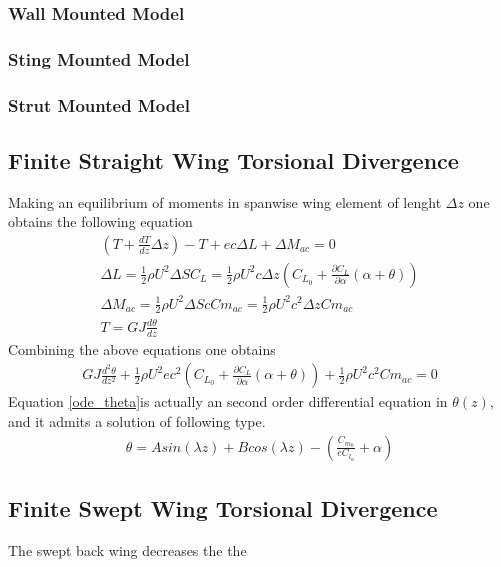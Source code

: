 \subsubsection{Wall Mounted Model}

\subsubsection{Sting Mounted Model}

\subsubsection{Strut Mounted Model}

\subsection{Finite Straight Wing Torsional Divergence}
Making an equilibrium of moments in spanwise wing element of lenght $\Delta z$ one obtains the following equation
\begin{align}
\left( T+\frac{d T}{d z}\Delta z \right)-T +ec\Delta L + \Delta M_{ac}=0\\
\Delta L= \frac{1}{2} \rho U^2 \Delta S C_L = \frac{1}{2} \rho U^2 c \Delta z \left( C_{L_0} + \frac{\partial C_L}{\partial \alpha}(\alpha + \theta) \right)\\
\Delta M_{ac}= \frac{1}{2} \rho U^2 \Delta S c Cm_{ac} = \frac{1}{2} \rho U^2 c^2 \Delta z Cm_{ac}\\
T=GJ \frac{d \theta}{dz}
\end{align}
Combining the above equations one obtains
\begin{align}
GJ\frac{d^2 \theta}{dz^2} + \frac{1}{2} \rho U^2 ec^2 \left( C_{L_0} + \frac{\partial C_L}{\partial \alpha}(\alpha + \theta) \right) + \frac{1}{2} \rho U^2 c^2 Cm_{ac}=0 \label{ode_theta}
\end{align}
Equation \eqref{ode_theta}is actually an second order differential equation in $\theta(z)$, and it admits a solution of following type.
\begin{align}
\theta= A sin(\lambda z) + B cos(\lambda z) - \left(\frac{C_{m_0}}{e C_{l_\alpha}} + \alpha \right)
\end{align}




\subsection{Finite Swept Wing Torsional Divergence}
The swept back wing decreases the the
